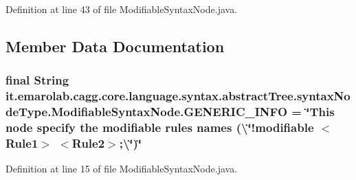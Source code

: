 Definition at line 43 of file Modifiable\-Syntax\-Node.\-java.



\subsection{Member Data Documentation}
\hypertarget{classit_1_1emarolab_1_1cagg_1_1core_1_1language_1_1syntax_1_1abstractTree_1_1syntaxNodeType_1_1ModifiableSyntaxNode_aa0438cc556ec676c8a326b3931e7b439}{
\subsubsection[{G\-E\-N\-E\-R\-I\-C\-\_\-\-I\-N\-F\-O}]{\setlength{\rightskip}{0pt plus 5cm}final String it.\-emarolab.\-cagg.\-core.\-language.\-syntax.\-abstract\-Tree.\-syntax\-Node\-Type.\-Modifiable\-Syntax\-Node.\-G\-E\-N\-E\-R\-I\-C\-\_\-\-I\-N\-F\-O = \char`\"{}This node specify the modifiable rules names (\textbackslash{}\char`\"{}!modifiable $<$Rule1$>$ $<$Rule2$>$;\textbackslash{}\char`\"{})\char`\"{}\hspace{0.3cm}{\ttfamily [static]}}}\label{classit_1_1emarolab_1_1cagg_1_1core_1_1language_1_1syntax_1_1abstractTree_1_1syntaxNodeType_1_1ModifiableSyntaxNode_aa0438cc556ec676c8a326b3931e7b439}


Definition at line 15 of file Modifiable\-Syntax\-Node.\-java.

